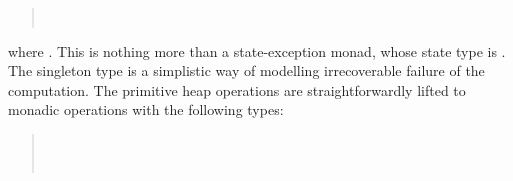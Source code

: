 \documentclass[copyright,creativecommons,sharealike]{eptcs}
\theoremstyle{remark}
\begin{document}
\begin{isabellebody}
\begin{isamarkuptext}
\begin{quote}
  \\
  \mbox{}
\end{quote}
  where .
  This is nothing more than a state-exception monad, whose state type
  is . The singleton type  is a simplistic way of
  modelling irrecoverable failure of the computation. The primitive heap operations
  are straightforwardly lifted to monadic operations with the
  following types:
  \begin{quote}
    \\
    \\
  \end{quote}
  

\end{isamarkuptext}
\end{isabellebody}
\end{document}
